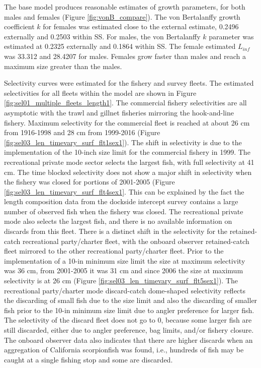 \documentclass[12pt,]{article}
\begin{document}
The base model produces reasonable estimates of growth parameters, for
both males and females (Figure \ref{fig:vonB_compare}). The von
Bertalanffy growth coefficient \(k\) for females was estimated close to
the external estimate, 0.2496 externally and 0.2503 within SS. For
males, the von Bertalanffy \(k\) parameter was estimated at 0.2325
externally and 0.1864 within SS. The female estimated \(L_{inf}\) was
33.312 and 28.4207 for males. Females grow faster than males and reach a
maximum size greater than the males.

Selectivity curves were estimated for the fishery and survey fleets. The
estimated selectivities for all fleets within the model are shown in
Figure \ref{fig:sel01_multiple_fleets_length1}. The commercial fishery
selectivities are all asymptotic with the trawl and gillnet fisheries
mirroring the hook-and-line fishery. Maximum selectivity for the
commercial fleet is reached at about 26 cm from 1916-1998 and 28 cm from
1999-2016 (Figure \ref{fig:sel03_len_timevary_surf_flt1sex1}). The shift
in selectivity is due to the implementation of the 10-inch size limit
for the commercial fishery in 1999. The recreational private mode sector
selects the largest fish, with full selectivity at 41 cm. The time
blocked selectivity does not show a major shift in selectivity when the
fishery was closed for portions of 2001-2005 (Figure
\ref{fig:sel03_len_timevary_surf_flt4sex1}. This can be explained by the
fact the length composition data from the dockside intercept survey
contains a large number of observed fish when the fishery was closed.
The recreational private mode also selects the largest fish, and there
is no available information on discards from this fleet. There is a
distinct shift in the selectivity for the retained-catch recreational
party/charter fleet, with the onboard observer retained-catch fleet
mirrored to the other recreational party/charter fleet. Prior to the
implementation of a 10-in minimum size limit the size at maximum
selectivity was 36 cm, from 2001-2005 it was 31 cm and since 2006 the
size at maximum selectivity is at 26 cm (Figure
\ref{fig:sel03_len_timevary_surf_flt5sex1}). The recreational
party/charter mode discard-catch dome-shaped selectivity reflects the
discarding of small fish due to the size limit and also the discarding
of smaller fish prior to the 10-in minimum size limit due to angler
preference for larger fish. The selectivity of the discard fleet does
not go to 0, because some larger fish are still discarded, either due to
angler preference, bag limits, and/or fishery closure. The onboard
observer data also indicates that there are higher discards when an
aggregation of California scorpionfish was found, i.e., hundreds of fish
may be caught at a single fishing stop and some are discarded.
\end{document}
